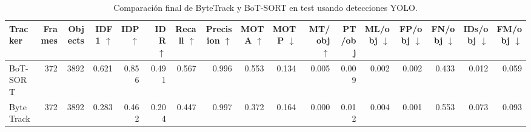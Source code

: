 \begin{table}
\caption{Comparación final de ByteTrack y BoT-SORT en test usando detecciones YOLO.}
\label{tab:tracking_final_test_yolo_comparison}
\begin{tabular}{lrrrrrrrrrrrrrrrr}
\toprule
Tracker & Frames & Objects & IDF1 $\uparrow$ & IDP $\uparrow$ & IDR $\uparrow$ & Recall $\uparrow$ & Precision $\uparrow$ & MOTA $\uparrow$ & MOTP $\downarrow$ & MT/obj $\uparrow$ & PT/obj & ML/obj $\downarrow$ & FP/obj $\downarrow$ & FN/obj $\downarrow$ & IDs/obj $\downarrow$ & FM/obj $\downarrow$ \\
\midrule
BoT-SORT & 372 & 3892 & 0.621 & 0.856 & 0.491 & 0.567 & 0.996 & 0.553 & 0.134 & 0.005 & 0.009 & 0.002 & 0.002 & 0.433 & 0.012 & 0.059 \\
ByteTrack & 372 & 3892 & 0.283 & 0.462 & 0.204 & 0.447 & 0.997 & 0.372 & 0.164 & 0.000 & 0.012 & 0.004 & 0.001 & 0.553 & 0.073 & 0.093 \\
\bottomrule
\end{tabular}
\end{table}

